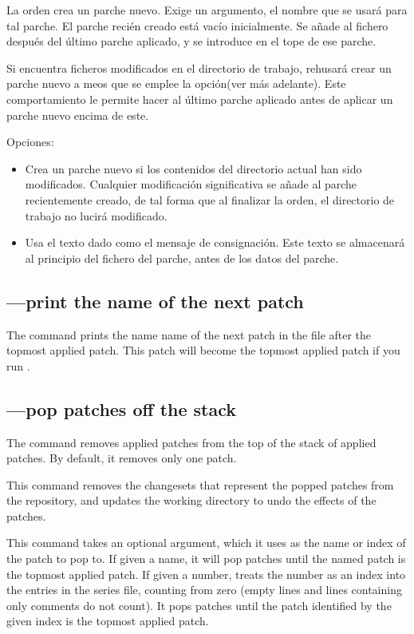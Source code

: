 La orden  crea un parche nuevo.  Exige un argumento,
el nombre que se usará para tal parche.  El parche recién creado está
vacío inicialmente.   Se añade al fichero  después
del último parche aplicado, y se introduce en el tope de ese parche.

Si  encuentra ficheros modificados en el directorio
de trabajo, rehusará crear un parche nuevo a meos que se emplee
 la opción(ver más adelante).  Este
comportamiento le permite hacer  al último parche
aplicado antes de aplicar un parche nuevo encima de este.

Opciones:
\begin{itemize}
\item[\hgxopt{mq}{qnew}{-f}] Crea un parche nuevo si los contenidos
  del directorio actual han sido modificados.  Cualquier modificación
  significativa se añade al parche recientemente creado,  de tal forma
  que al finalizar la orden, el directorio de trabajo no lucirá
  modificado.
\item[\hgxopt{mq}{qnew}{-m}] Usa el texto dado como el mensaje de
  consignación.  Este texto se almacenará al principio del fichero del
  parche, antes de los datos del parche.
\end{itemize}

\subsection{---print the name of the next patch}

The  command prints the name name of the next patch in
the  file after the topmost applied patch.  This
patch will become the topmost applied patch if you run .

\subsection{---pop patches off the stack}

The  command removes applied patches from the top of the
stack of applied patches.  By default, it removes only one patch.

This command removes the changesets that represent the popped patches
from the repository, and updates the working directory to undo the
effects of the patches.

This command takes an optional argument, which it uses as the name or
index of the patch to pop to.  If given a name, it will pop patches
until the named patch is the topmost applied patch.  If given a
number,  treats the number as an index into the entries in
the series file, counting from zero (empty lines and lines containing
only comments do not count).  It pops patches until the patch
identified by the given index is the topmost applied patch.

